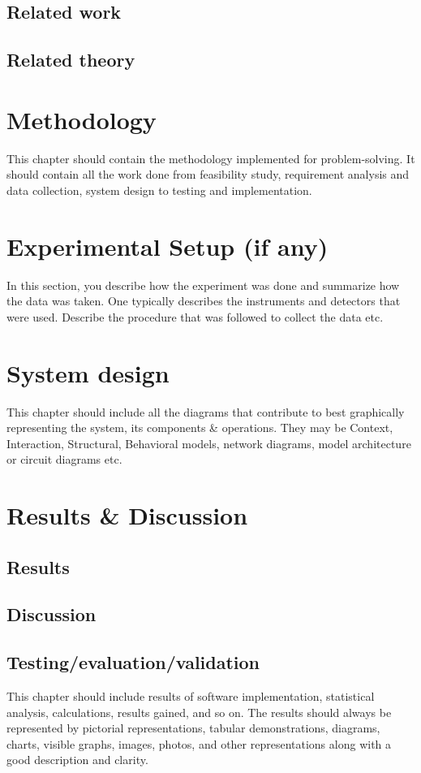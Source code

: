 \documentclass[12pt]{report}
\begin{document}
\section{Related work}
\section{Related theory}
\chapter{Methodology}
This chapter should contain the methodology implemented for problem-solving. It should contain all the work done from feasibility study, requirement analysis and data collection, system design to testing and implementation.
\chapter{Experimental Setup (if any)}
In this section, you describe how the experiment was done and summarize how the data was taken. One typically describes the instruments and detectors that were used. Describe the procedure that was followed to collect the data etc.
\chapter{System design}
This chapter should include all the diagrams that contribute to best graphically representing the system, its components \& operations. They may be Context, Interaction, Structural, Behavioral models, network diagrams, model architecture or circuit diagrams etc.
\chapter{Results \& Discussion}
\section{Results}
\section{Discussion}
\section{Testing/evaluation/validation}
This chapter should include results of software implementation, statistical analysis, calculations, results gained, and so on. The results should always be represented by pictorial representations, tabular demonstrations, diagrams, charts, visible graphs, images, photos, and other representations along with a good description and clarity.
\end{document}
